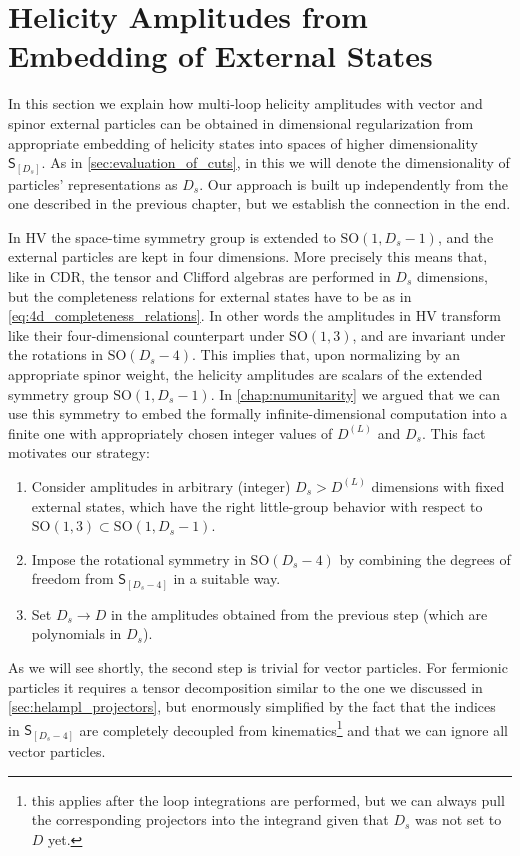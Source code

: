 \section{Helicity Amplitudes from Embedding of External States}
\label{sec:helampl_embeding}

In this section we explain how multi-loop helicity amplitudes
with vector and spinor external particles can be obtained in dimensional regularization
from appropriate embedding of helicity states into spaces of higher dimensionality $\mathsf{S}_{[D_s]}$.
As in \cref{sec:evaluation_of_cuts}, in this  we will denote the dimensionality of particles'
representations as $D_s$.
Our approach is built up independently from the one described in the previous chapter, but we establish
the connection in the end.

In HV the space-time symmetry group is extended to $\mathrm{SO}(1,D_s-1)$, and the external particles are kept in four dimensions. 
More precisely this means that, like in CDR, the tensor and Clifford algebras are performed in $D_s$ dimensions,
but the completeness relations for external states have to be as in \cref{eq:4d_completeness_relations}. 
In other words the amplitudes in HV transform like their four-dimensional counterpart under $\mathrm{SO}(1,3)$, 
and are invariant under the rotations in $\mathrm{SO}(D_s-4)$. 
This implies that, upon normalizing by an appropriate spinor weight, the helicity amplitudes are scalars of the extended symmetry group $\mathrm{SO}(1,D_s-1)$.
In \cref{chap:numunitarity} we argued that we can use this symmetry to embed the formally infinite-dimensional computation
into a finite one with appropriately chosen integer values of $D^{(L)}$ and $D_s$.
This fact motivates our strategy:
\begin{enumerate}
  \item Consider amplitudes in arbitrary (integer) $D_s > D^{(L)}$ dimensions with fixed external states,
    which have the right little-group behavior with respect to $\mathrm{SO}(1,3) \subset \mathrm{SO}(1,D_s-1)$.
  \item Impose the rotational symmetry in $\mathrm{SO}(D_s-4)$ by combining the degrees of freedom from $\mathsf{S}_{[D_s-4]}$ in
    a suitable way.
  \item Set $D_s\to D$ in the amplitudes obtained from the previous step (which are polynomials in $D_s$).
\end{enumerate}
As we will see shortly, the second step is trivial for vector particles. For fermionic
particles it requires a tensor decomposition similar to the one we discussed in \cref{sec:helampl_projectors},
but enormously simplified by the fact that the indices in  $\mathsf{S}_{[D_s-4]}$ are completely decoupled from kinematics\footnote{
  this applies after the loop integrations are performed, 
  but we can always pull the corresponding projectors into the integrand given that $D_s$ was not set to $D$ yet.
}
and that we can ignore all vector particles.



